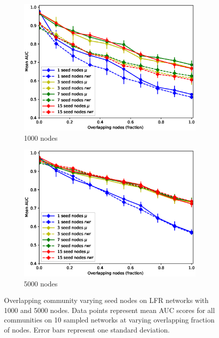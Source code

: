\documentclass[sigconf]{acmart}
\begin{document}
\begin{figure}[t]
    \centering
    \begin{subfigure}[b]{0.45\textwidth}
        \centering
        \includegraphics[width=\textwidth]{images/lfr_binary_overlap_auc_1000.eps}
        \caption{1000 nodes}
    \end{subfigure}
    \begin{subfigure}[b]{0.45\textwidth}
        \centering
        \includegraphics[width=\textwidth]{images/lfr_binary_overlap_auc_5000.eps}
        \caption{5000 nodes}
    \end{subfigure}
    \caption{Overlapping community varying seed nodes on LFR networks with 1000 and 5000 nodes.
     Data points represent mean AUC scores for all communities on 10 sampled networks at varying overlapping fraction of nodes.
     Error bars represent one standard deviation.}
     \label{fig:auc_overlap}
\end{figure}
\end{document}
